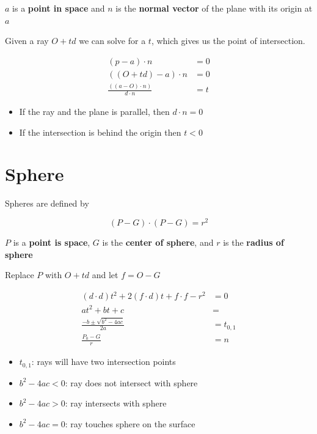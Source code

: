   $ a $ is a \textbf{point in space} and $ n $ is the \textbf{normal vector}
  of the plane with its origin at $ a $

  Given a ray $ O + td $ we can solve for a $ t $, which gives us the
  point of intersection.

  \begin{align*}
    \left( p - a \right) \cdot n &= 0 \\
    \left( \left( O + td \right) - a \right) \cdot n &= 0 \\
    \frac{\left( \left( a - O \right) \cdot n \right)}{d \cdot n} &= t
  \end{align*}

  \begin{itemize}
    \item If the ray and the plane is parallel, then $ d \cdot n = 0 $
    \item If the intersection is behind the origin then $ t < 0 $
  \end{itemize}

\section{Sphere}

  Spheres are defined by

  \begin{equation}
    \left( P - G \right) \cdot \left( P - G \right) = r^{2}
  \end{equation}

  $ P $ is a \textbf{point is space}, $ G $ is the \textbf{center of sphere},
  and $ r $ is the \textbf{radius of sphere}

  Replace $ P $ with $ O + td $ and let $ f = O - G  $

  \begin{align}
    \left( d \cdot d \right) t^{2}
      + 2 \left( f \cdot d \right) t
      + f \cdot f - r^{2}
    &= 0 \\
    a t^{2} + bt + c &= \\
    \frac{-b \pm \sqrt{b^{2} - 4ac}}{2a} &= t_{0, 1} \\
    \frac{P_{0} - G}{r} &= n
  \end{align}

  \begin{itemize}
    \item $ t_{0, 1} $: rays will have two intersection points
    \item $ b^{2} - 4ac < 0 $: ray does not intersect with sphere
    \item $ b^{2} - 4ac > 0 $: ray intersects with sphere
    \item $ b^{2} - 4ac = 0 $: ray touches sphere on the surface
  \end{itemize}

